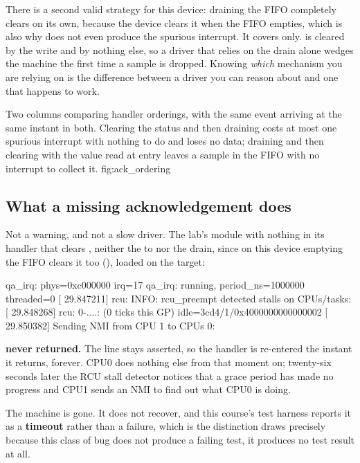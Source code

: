 There is a second valid strategy for this device: draining the FIFO completely clears
 on its own, because the device clears it when the FIFO empties, which is also why
 does not even produce the spurious interrupt. It covers  only.
 is cleared by the write and by nothing else, so a driver that relies on the drain
alone wedges the machine the first time a sample is dropped. Knowing \emph{which} mechanism you are
relying on is the difference between a driver you can reason about and one that happens to work.

  {Two columns comparing handler orderings, with the same event arriving at the same instant in both.
   Clearing the status and then draining costs at most one spurious interrupt with nothing to do and
   loses no data; draining and then clearing with the value read at entry leaves a sample in the FIFO with
   no interrupt to collect it.}
  {fig:ack_ordering}

\subsection{What a missing acknowledgement does}
\label{c8:app:a6}

Not a warning, and not a slow driver. The lab's module with nothing in its handler that clears
, neither the  to  nor the drain, since on this
device emptying the FIFO clears it too (), loaded on the target:

\begin{console}
qa_irq: phys=0xc000000 irq=17
qa_irq: running, period_ns=1000000 threaded=0
[   29.847211] rcu: INFO: rcu_preempt detected stalls on CPUs/tasks:
[   29.848268] rcu:  0-....: (0 ticks this GP) idle=3cd4/1/0x4000000000000002
[   29.850382] Sending NMI from CPU 1 to CPUs 0:
\end{console}

\noindent \textbf{ never returned.} The line stays asserted, so the handler is
re-entered the instant it returns, forever. CPU0 does nothing else from that moment on; twenty-six
seconds later the RCU stall detector notices that a grace period has made no progress and CPU1 sends
an NMI to find out what CPU0 is doing.

The machine is gone. It does not recover, and this course's test harness reports it as a
\textbf{timeout} rather than a failure, which is the distinction  draws precisely
because this class of bug does not produce a failing test, it produces no test result at all.

